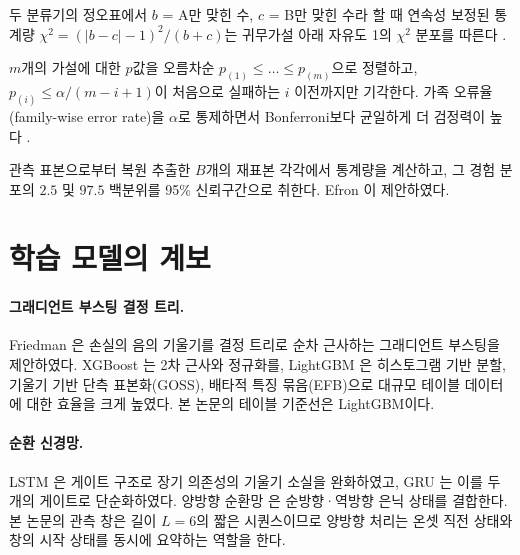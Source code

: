 \begin{definition}[McNemar 검정]
두 분류기의 정오표에서 $b$ = A만 맞힌 수, $c$ = B만 맞힌 수라 할 때 연속성 보정된 통계량 $\chi^2 = (|b-c|-1)^2/(b+c)$는 귀무가설 아래 자유도 1의 $\chi^2$ 분포를 따른다 \cite{mcnemar1947note}.
\end{definition}

\begin{definition}
$m$개의 가설에 대한 $p$값을 오름차순 $p_{(1)} \le \dots \le p_{(m)}$으로 정렬하고, $p_{(i)} \le \alpha/(m-i+1)$이 처음으로 실패하는 $i$ 이전까지만 기각한다. 가족 오류율(family-wise error rate)을 $\alpha$로 통제하면서 Bonferroni보다 균일하게 더 검정력이 높다 \cite{holm1979simple}.
\end{definition}

\begin{definition}
관측 표본으로부터 복원 추출한 $B$개의 재표본 각각에서 통계량을 계산하고, 그 경험 분포의 $2.5$ 및 $97.5$ 백분위를 95\% 신뢰구간으로 취한다. Efron \cite{efron1979bootstrap}이 제안하였다.
\end{definition}

\section{학습 모델의 계보}
\label{sec:bg-models}

\paragraph{그래디언트 부스팅 결정 트리.} Friedman \cite{friedman2001greedy}은 손실의 음의 기울기를 결정 트리로 순차 근사하는 그래디언트 부스팅을 제안하였다. XGBoost \cite{chen2016xgboost}는 2차 근사와 정규화를, LightGBM \cite{ke2017lightgbm}은 히스토그램 기반 분할, 기울기 기반 단측 표본화(GOSS), 배타적 특징 묶음(EFB)으로 대규모 테이블 데이터에 대한 효율을 크게 높였다. 본 논문의 테이블 기준선은 LightGBM이다.

\paragraph{순환 신경망.} LSTM \cite{hochreiter1997long}은 게이트 구조로 장기 의존성의 기울기 소실을 완화하였고, GRU \cite{cho2014learning}는 이를 두 개의 게이트로 단순화하였다. 양방향 순환망 \cite{schuster1997bidirectional}은 순방향·역방향 은닉 상태를 결합한다. 본 논문의 관측 창은 길이 $L=6$의 짧은 시퀀스이므로 양방향 처리는 온셋 직전 상태와 창의 시작 상태를 동시에 요약하는 역할을 한다.

